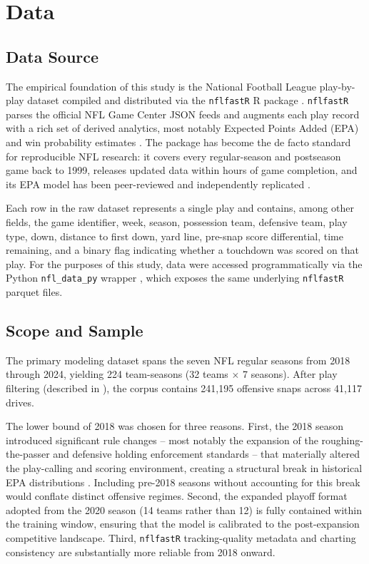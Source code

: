 \section{Data}
\label{sec:data}

\subsection{Data Source}

The empirical foundation of this study is the National Football League
play-by-play dataset compiled and distributed via the \texttt{nflfastR} R
package \parencite{carl2021nflfastr}. \texttt{nflfastR} parses the official
NFL Game Center JSON feeds and augments each play record with a rich set of
derived analytics, most notably Expected Points Added (EPA) and win
probability estimates \parencite{yurko2019nflwar}. The package has become the
de facto standard for reproducible NFL research: it covers every regular-season
and postseason game back to 1999, releases updated data within hours of game
completion, and its EPA model has been peer-reviewed and independently
replicated \parencite{yurko2019nflwar}.

Each row in the raw dataset represents a single play and contains, among
other fields, the game identifier, week, season, possession team, defensive
team, play type, down, distance to first down, yard line, pre-snap score
differential, time remaining, and a binary flag indicating whether a
touchdown was scored on that play. For the purposes of this study, data were
accessed programmatically via the Python \texttt{nfl\_data\_py} wrapper \parencite{cooper2023nfldatapy}, which
exposes the same underlying \texttt{nflfastR} parquet files.

\subsection{Scope and Sample}

The primary modeling dataset spans the seven NFL regular seasons from 2018
through 2024, yielding 224 team-seasons (32 teams $\times$ 7 seasons). After
play filtering (described in ), the corpus contains
241,195 offensive snaps across 41,117 drives.

The lower bound of 2018 was chosen for three reasons. First, the 2018 season
introduced significant rule changes -- most notably the expansion of the
roughing-the-passer and defensive holding enforcement standards -- that
materially altered the play-calling and scoring environment, creating a
structural break in historical EPA distributions
\parencite{yurko2019nflwar}. Including pre-2018 seasons
without accounting for this break would conflate distinct offensive regimes.
Second, the expanded playoff format adopted from the 2020 season \parencite{nfl2020playoffexpansion} (14 teams
rather than 12) is fully contained within the training window, ensuring that
the \xscore{} model is calibrated to the post-expansion competitive
landscape. Third, \texttt{nflfastR} tracking-quality metadata and charting
consistency are substantially more reliable from 2018 onward.

